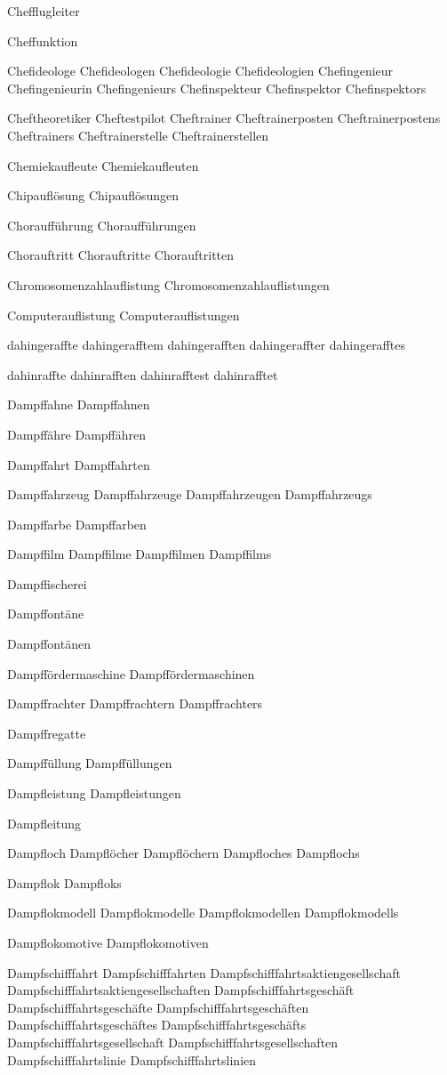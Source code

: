 Chefflugleiter

Cheffunktion

Chefideologe
Chefideologen
Chefideologie
Chefideologien
Chefingenieur
Chefingenieurin
Chefingenieurs
Chefinspekteur
Chefinspektor
Chefinspektors

Cheftheoretiker 
Cheftestpilot
Cheftrainer
Cheftrainerposten
Cheftrainerpostens
Cheftrainers
Cheftrainerstelle
Cheftrainerstellen

Chemiekaufleute
Chemiekaufleuten

Chipauflösung
Chipauflösungen

Choraufführung
Choraufführungen

Chorauftritt
Chorauftritte
Chorauftritten

Chromosomenzahlauflistung
Chromosomenzahlauflistungen

Computerauflistung
Computerauflistungen

dahingeraffte
dahingerafftem
dahingerafften
dahingeraffter
dahingerafftes

dahinraffte
dahinrafften
dahinrafftest
dahinrafftet

Dampffahne
Dampffahnen

Dampffähre
Dampffähren

Dampffahrt
Dampffahrten

Dampffahrzeug
Dampffahrzeuge
Dampffahrzeugen
Dampffahrzeugs

Dampffarbe
Dampffarben

Dampffilm
Dampffilme
Dampffilmen
Dampffilms

Dampffischerei

Dampffontäne

Dampffontänen

Dampffördermaschine
Dampffördermaschinen

Dampffrachter
Dampffrachtern
Dampffrachters

Dampffregatte

Dampffüllung
Dampffüllungen

Dampfleistung
Dampfleistungen

Dampfleitung

Dampfloch
Dampflöcher
Dampflöchern
Dampfloches
Dampflochs

Dampflok
Dampfloks

Dampflokmodell
Dampflokmodelle
Dampflokmodellen
Dampflokmodells

Dampflokomotive
Dampflokomotiven

Dampfschifffahrt
Dampfschifffahrten
Dampfschifffahrtsaktiengesellschaft
Dampfschifffahrtsaktiengesellschaften
Dampfschifffahrtsgeschäft
Dampfschifffahrtsgeschäfte
Dampfschifffahrtsgeschäften
Dampfschifffahrtsgeschäftes
Dampfschifffahrtsgeschäfts
Dampfschifffahrtsgesellschaft
Dampfschifffahrtsgesellschaften
Dampfschifffahrtslinie
Dampfschifffahrtslinien


